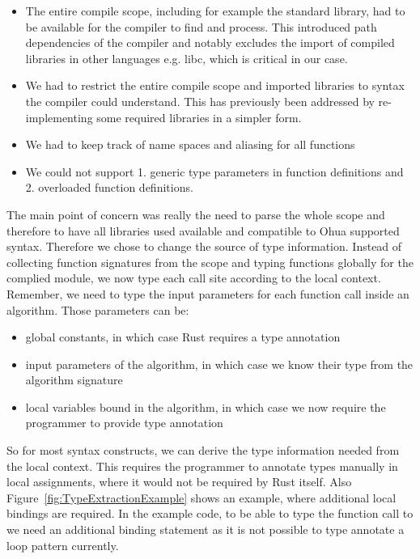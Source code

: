 \begin{itemize}
    \item The entire compile scope, including for example the standard library, had to be available for the compiler to find and process. This introduced path dependencies of the compiler and notably excludes the import of compiled libraries in other languages e.g. libc, which is critical in our case.
    \item We had to restrict the entire compile scope and imported libraries to syntax the compiler could understand. This has previously been addressed by re-implementing some required libraries in a simpler form. 
    \item We had to keep track of name spaces and aliasing for all functions
    \item We could not support 1. generic type parameters in function definitions and 2. overloaded function definitions.
\end{itemize}

The main point of concern was really the need to parse the whole scope and therefore to have all libraries used available and compatible to Ohua supported syntax. Therefore we chose to change the source of type information. Instead of collecting function signatures from the scope and typing functions globally for the complied module, we now type each call site according to the local context. Remember, we need to type the input parameters for each function call inside an algorithm. Those parameters can be: 

\begin{itemize}
    \item global constants, in which case Rust requires a type annotation
    \item input parameters of the algorithm, in which case we know their type from the algorithm signature
    \item local variables bound in the algorithm, in which case we now require the programmer to provide type annotation 
\end{itemize}

So for most syntax constructs, we can derive the type information needed from the local context. This requires the programmer to annotate types manually in local assignments, where it would not be required by Rust itself. Also Figure~\ref{fig:TypeExtractionExample} shows an example, where additional local bindings are required. In the example code, to be able to type the function call to  we need an additional binding statement as it is not possible to type annotate a loop pattern currently. 

